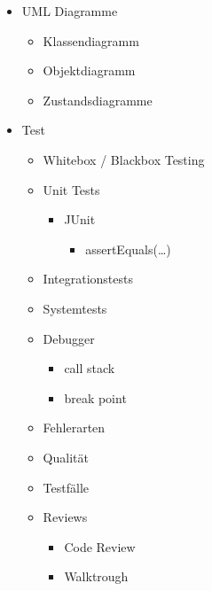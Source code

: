 \begin{itemize}
    \item UML Diagramme
    \begin{itemize}
        \item Klassendiagramm
        \item Objektdiagramm
        \item Zustandsdiagramme
    \end{itemize}
    
    \item Test
    \begin{itemize}
        \item Whitebox / Blackbox Testing
        \item Unit Tests
        \begin{itemize}
            \item JUnit
            \begin{itemize}
                \item assertEquals(\dots)
            \end{itemize}
        \end{itemize}
        \item Integrationstests
        \item Systemtests
        \item Debugger
        \begin{itemize}
            \item call stack
            \item break point
        \end{itemize}
        \item Fehlerarten
        \item Qualität
        \item Testfälle
        \item Reviews
        \begin{itemize}
            \item Code Review
            \item Walktrough
        \end{itemize}
    \end{itemize}
    
\end{itemize}
